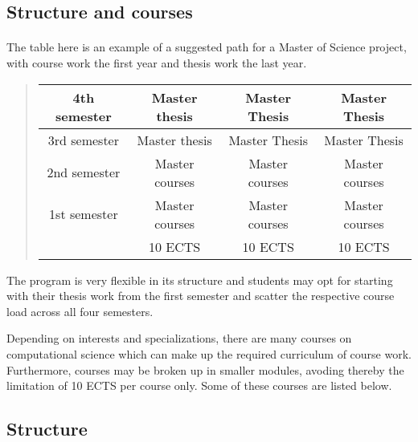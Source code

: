\documentclass[%
twoside,                 %
final,                   %
10pt]{article}
\begin{document}
\subsection*{Structure and courses}

\paragraph{}
The table here is an example of a suggested path for a Master of Science project,
with course work the first year and thesis work the last year. 

\begin{quote}
\begin{tabular}{cccc}
\hline
\multicolumn{1}{c}{ 4th semester } & \multicolumn{1}{c}{ Master thesis } & \multicolumn{1}{c}{ Master Thesis } & \multicolumn{1}{c}{ Master Thesis } \\
\hline
3rd semester & Master thesis  & Master Thesis  & Master Thesis  \\
\hline
2nd semester & Master courses & Master courses & Master courses \\
\hline
1st semester & Master courses & Master courses & Master courses \\
\hline
             & 10 ECTS        & 10 ECTS        & 10 ECTS        \\
\hline
\end{tabular}
\end{quote}

\noindent
The program is very flexible in its structure and students may opt for starting with their thesis 
work from the first semester and scatter the respective course load across all four semesters.

Depending on interests and specializations, there are many courses on computational science which can make 
up the required curriculum of course work. Furthermore, courses may be broken up in smaller modules,
avoding thereby the limitation of 10 ECTS per course only. Some of these courses are listed below.




\subsection*{Structure}

\end{document}
